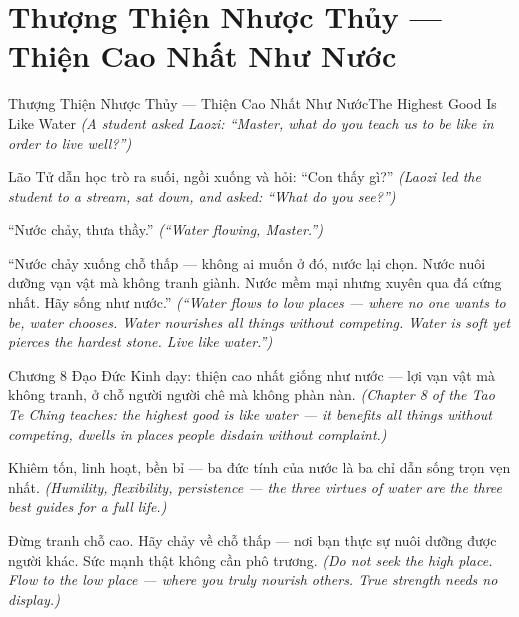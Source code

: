 \section{Thượng Thiện Nhược Thủy — Thiện Cao Nhất Như Nước}
\begin{truyen}{Thượng Thiện Nhược Thủy — Thiện Cao Nhất Như Nước}{The Highest Good Is Like Water}
\textit{(A student asked Laozi: ``Master, what do you teach us to be like in order to live well?'')}

Lão Tử dẫn học trò ra suối, ngồi xuống và hỏi: ``Con thấy gì?''
\textit{(Laozi led the student to a stream, sat down, and asked: ``What do you see?'')}

``Nước chảy, thưa thầy.''
\textit{(``Water flowing, Master.'')}

``Nước chảy xuống chỗ thấp — không ai muốn ở đó, nước lại chọn. Nước nuôi dưỡng vạn vật mà không tranh giành. Nước mềm mại nhưng xuyên qua đá cứng nhất. Hãy sống như nước.''
\textit{(``Water flows to low places — where no one wants to be, water chooses. Water nourishes all things without competing. Water is soft yet pierces the hardest stone. Live like water.'')}

Chương 8 Đạo Đức Kinh dạy: thiện cao nhất giống như nước — lợi vạn vật mà không tranh, ở chỗ người người chê mà không phàn nàn.
\textit{(Chapter 8 of the Tao Te Ching teaches: the highest good is like water — it benefits all things without competing, dwells in places people disdain without complaint.)}

Khiêm tốn, linh hoạt, bền bỉ — ba đức tính của nước là ba chỉ dẫn sống trọn vẹn nhất.
\textit{(Humility, flexibility, persistence — the three virtues of water are the three best guides for a full life.)}

\end{truyen}

\begin{baihoc}
Đừng tranh chỗ cao. Hãy chảy về chỗ thấp — nơi bạn thực sự nuôi dưỡng được người khác. Sức mạnh thật không cần phô trương.
\textit{(Do not seek the high place. Flow to the low place — where you truly nourish others. True strength needs no display.)}
\end{baihoc}
\ngancach

